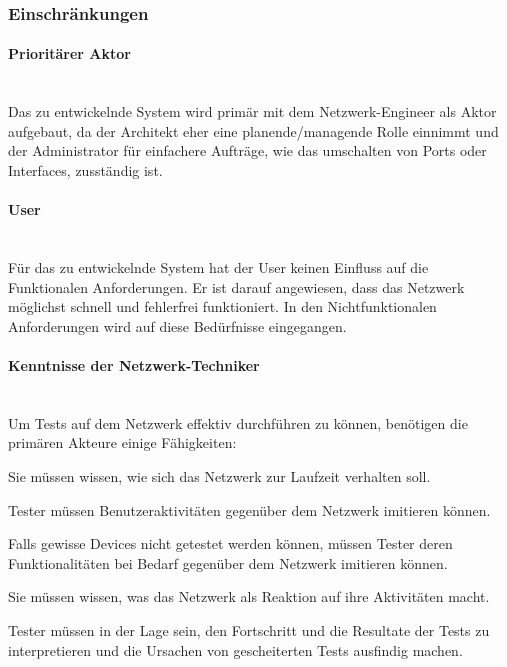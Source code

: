 \documentclass[
	ngerman,
	toc=listof, %
	toc=bibliography, %
	footnotes=multiple, %
	parskip=half, %
	numbers=noendperiod %
]{scrartcl}
\begin{document}
		\subsubsection{Einschränkungen}

			\paragraph{Prioritärer Aktor} ~\\
			Das zu entwickelnde System wird primär mit dem Netzwerk-Engineer als Aktor aufgebaut, da der Architekt eher eine planende/managende Rolle einnimmt und der Administrator für einfachere Aufträge, wie das umschalten von Ports oder Interfaces, zusständig ist.


			\paragraph{User} ~\\
			Für das zu entwickelnde System hat der User keinen Einfluss auf die Funktionalen Anforderungen. 
			Er ist darauf angewiesen, dass das Netzwerk möglichst schnell und fehlerfrei funktioniert. 
			In den Nichtfunktionalen Anforderungen wird auf diese Bedürfnisse eingegangen.

			\paragraph{Kenntnisse der Netzwerk-Techniker} ~\\
			Um Tests auf dem Netzwerk effektiv durchführen zu können, benötigen die primären Akteure einige Fähigkeiten:

			Sie müssen wissen, wie sich das Netzwerk zur Laufzeit verhalten soll.

			Tester müssen Benutzeraktivitäten gegenüber dem Netzwerk imitieren können.

			Falls gewisse Devices nicht getestet werden können, müssen Tester deren Funktionalitäten bei Bedarf gegenüber dem Netzwerk imitieren können.

			Sie müssen wissen, was das Netzwerk als Reaktion auf ihre Aktivitäten macht.

			Tester müssen in der Lage sein, den Fortschritt und die Resultate der Tests zu interpretieren und die Ursachen von gescheiterten Tests ausfindig machen.
\end{document}
